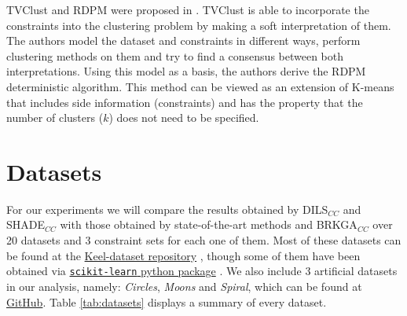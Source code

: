 \acf{TVClust} and \acf{RDPM} were proposed in \cite{khashabi2015clustering}. \acs{TVClust} is able to incorporate the constraints into the clustering problem by making a soft interpretation of them. The authors model the dataset and constraints in different ways, perform clustering methods on them and try to find a consensus between both interpretations. Using this model as a basis, the authors derive the \acs{RDPM} deterministic algorithm. This method can be viewed as an extension of K-means that includes side information (constraints) and has the property that the number of clusters ($k$) does not need to be specified.

\section{Datasets} \label{sec:Datasets}

For our experiments we will compare the results obtained by \acs{DILS}$_{CC}$ and \acs{SHADE}$_{CC}$ with those obtained by state-of-the-art methods and \acs{BRKGA}$_{CC}$ over 20 datasets and 3 constraint sets for each one of them. Most of these datasets can be found at the \href{https://sci2s.ugr.es/keel/category.php?cat=clas}{Keel-dataset repository} \cite{triguero2017keel}, though some of them have been obtained via
\href{https://scikit-learn.org/stable/datasets/index.html}{\texttt{scikit-learn} python package} \cite{scikit-learn}. We also include 3 artificial datasets in our analysis, namely: \textit{Circles}, \textit{Moons} and \textit{Spiral}, which can be found at \href{https://github.com/GermangUgr/DILS_CC}{GitHub}. Table \ref{tab:datasets} displays a summary of every dataset.

